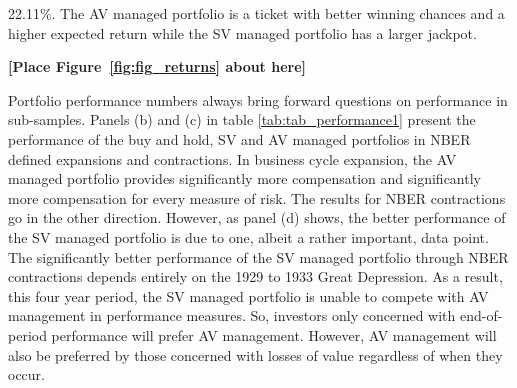 22.11\%. The AV managed portfolio is a ticket with better winning chances and a higher expected return while the SV managed portfolio has a larger jackpot.

\bigskip
\centerline{\bf [Place Figure~\ref{fig:fig_returns} about here]}
\bigskip

Portfolio performance numbers always bring forward questions on performance in sub-samples. 
Panels (b) and (c) in table \ref{tab:tab_performance1} present the performance of the buy and hold, SV and AV managed portfolios in NBER defined expansions and contractions. In business cycle expansion, the AV managed portfolio provides significantly more compensation and significantly more compensation for every measure of risk. The results for NBER contractions go in the other direction. %
However, as panel (d) shows, the better performance of the SV managed portfolio is due to one, albeit a rather important, data point. The significantly better performance of the SV managed portfolio through NBER contractions depends entirely on the 1929 to 1933 Great Depression. %
As a result, this four year period, the SV managed portfolio is unable to compete with AV management in performance measures. %
So, investors only concerned with end-of-period performance will prefer AV management. However, AV management will also be preferred by those concerned with losses of value regardless of when they occur.
